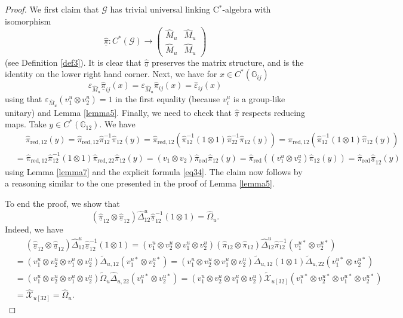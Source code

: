 \documentclass[reqno]{amsart}
\numberwithin{equation}{section}
\newcommand{\G}{\mathbb{G}}
\newcommand{\msG}{\mathscr{G}}
\newcommand{\red}{\mathrm{red}}
\newcommand{\mc}{\mathcal}
\newcommand{\eps}{\varepsilon}
\newcommand{\wh}{\widehat}
\begin{document}
\begin{proof}
We first claim that $\msG$ has trivial universal linking C$^*$-algebra with isomorphism 
\[
\underline{\hat{\pi}}\colon C^*(\msG)\rightarrow \begin{pmatrix}
\hat{M}_u & \hat{M}_u \\
\hat{M}_u & \hat{M}_u
\end{pmatrix}
\] 
(see Definition \ref{def3}). It is clear that $\underline{\hat{\pi}}$ preserves the matrix structure, and is  the identity on the lower right hand corner. Next, we have for $x\in C^*(\G_{ij})$
\[
\eps_{\hat{M}_u} \underline{\hat{\pi}}_{ij}(x)=
\eps_{\hat{M}_u} \hat{\pi}_{ij}(x)=\hat{\eps}_{ij}(x)
\]
using that $\eps_{\hat{M}_u}(v_1^u\otimes v_2^u)=1$ in the first equality (because $v_i^u$ is a group-like unitary) and Lemma \ref{lemma5}. Finally, we need to check that $\underline{\hat{\pi}}$ respects reducing maps. Take $y\in C^*(\G_{12})$. We have
\[\begin{split}
&\quad\;
\hat{\pi}_{\red,12}(y)=
\hat{\pi}_{\red,12} \hat{\pi}^{-1}_{12}\hat{\pi}_{12}(y)=
\hat{\pi}_{\red,12} (\hat{\pi}^{-1}_{12}(1\otimes 1)
\hat{\pi}^{-1}_{22}\hat{\pi}_{12}(y))=
\hat{\pi}_{\red,12} (\hat{\pi}^{-1}_{12}(1\otimes 1)
\hat{\pi}_{12}(y))\\
&=
\hat{\pi}_{\red,12} \hat{\pi}^{-1}_{12}(1\otimes 1)
\hat{\pi}_{\red,22}\hat{\pi}_{12}(y)=
(v_1\otimes v_2) \hat{\pi}_{\red}\hat{\pi}_{12}(y)=
\hat{\pi}_{\red}( (v_1^u\otimes v_2^u) \hat{\pi}_{12}(y))=
\hat{\pi}_{\red} \underline{\hat{\pi}}_{12} (y)
\end{split}\]
using Lemma \ref{lemma7} and the explicit formula \eqref{eq34}. The claim now follows by a reasoning similar to the one presented in the proof of Lemma \ref{lemma5}.

To end the proof, we show that
\begin{equation}\label{eq35}
(\underline{\hat{\pi}}_{12}\otimes 
\underline{\hat{\pi}}_{12})\hat{\Delta}^u_{12}
\underline{\hat{\pi}}_{12}^{-1}(1\otimes 1)=\hat{\Omega}_u.
\end{equation}
Indeed, we have
\[\begin{split}
&\quad\;
(\underline{\hat{\pi}}_{12}\otimes 
\underline{\hat{\pi}}_{12})\hat{\Delta}^u_{12}
\underline{\hat{\pi}}_{12}^{-1}(1\otimes 1)=
(v_1^u\otimes v_2^u\otimes 
v_1^u\otimes v_2^u)(\hat{\pi}_{12}\otimes 
\hat{\pi}_{12})\hat{\Delta}^u_{12}
\hat{\pi}^{-1}_{12}(
v_1^{u *}\otimes v_2^{u *}
)\\
&=
(v_1^u\otimes v_2^u\otimes 
v_1^u\otimes v_2^u)
\widetilde{\Delta}_{u,12} (
v_1^{u *}\otimes v_2^{u *}
)=
(v_1^u\otimes v_2^u\otimes 
v_1^u\otimes v_2^u)
\widetilde{\Delta}_{u,12} (
1\otimes 1
)
\widetilde{\Delta}_{u,22} (
v_1^{u *}\otimes v_2^{u *}
)\\
&=
(v_1^u\otimes v_2^u\otimes 
v_1^u\otimes v_2^u)
\widetilde{\Omega}_u
\hat{\Delta}_{u,22}(v_1^{u *}\otimes v_2^{u *})=
(v_1^u\otimes v_2^u\otimes 
v_1^{u }\otimes v_2^{u })
\widetilde{\mc{X}}_{u [32]}
(v_1^{u *}\otimes v_2^{u *}\otimes 
v_1^{u *}\otimes v_2^{u *})\\
&=
\wh{\mc{X}}_{u [32]}=\hat{\Omega}_u.
\end{split}\]
\end{proof}
\end{document}
